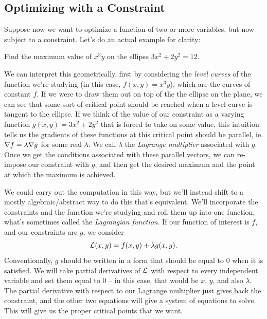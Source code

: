 
\subsection{Optimizing with a Constraint}
Suppose now we want to optimize a function of two or more variables, but now subject to a constraint. Let's do an actual example for clarity: 
\begin{problem}
Find the maximum value of $x^3y$ on the ellipse $3x^2+2y^2 = 12$. 
\end{problem}
We can interpret this geometrically, first by considering the \textit{level curves} of the function we're studying (in this case, $f(x, y) = x^3y$), which are the curves of constant $f$. If we were to draw them out on top of the the ellipse on the plane, we can see that some sort of critical point should be reached when a level curve is tangent to the ellipse. If we think of the value of our constraint as a varying function $g(x, y) = 3x^2 + 2y^2$ that is forced to take on some value, this intuition tells us the gradients of these functions at this critical point should be parallel, ie. $\nabla f = \lambda \nabla g$ for some real $\lambda$. We call $\lambda$ the \textit{Lagrange multiplier} associated with $g$. Once we get the conditions associated with these parallel vectors, we can re-impose our constraint with $g$, and then get the desired maximum and the point at which the maximum is achieved. 

We could carry out the computation in this way, but we'll instead shift to a mostly algebraic/abstract way to do this that's equivalent. We'll incorporate the constraints and the function we're studying and roll them up into one function, what's sometimes called the \textit{Lagrangian function}. If our function of interest is $f$, and our constraints are $g$, we consider
\[
	\mathcal{L}(x, y) = f(x,y) + \lambda g(x, y).
\]
Conventionally, $g$ should be written in a form that should be equal to 0 when it is satisfied. We will take partial derivatives of $\mathcal{L}$ with respect to every independent variable and set them equal to 0 -- in this case, that would be $x$, $y$, and also $\lambda$. The partial derivative with respect to our Lagrange multiplier just gives back the constraint, and the other two equations will give a system of equations to solve. This will give us the proper critical points that we want. 

